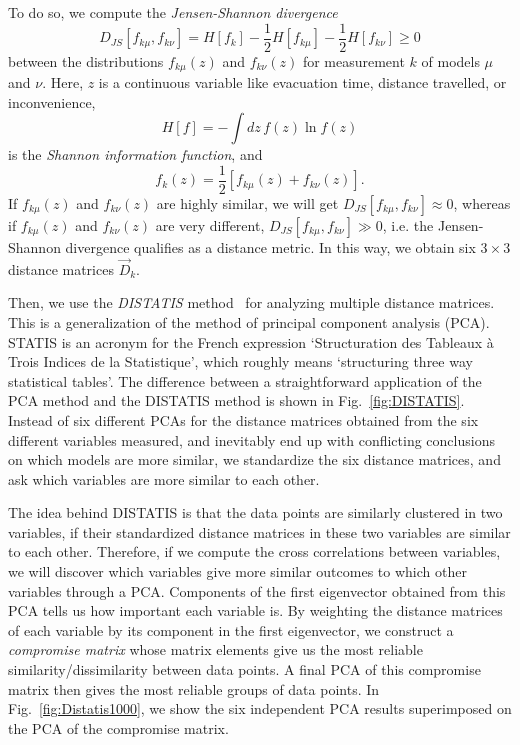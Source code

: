 To do so, we compute the \emph{Jensen-Shannon divergence}~\cite{Lin:1991it}
\begin{equation}
D_{JS}[f_{k\mu}, f_{k\nu}] = H[f_k] - \frac{1}{2} H[f_{k\mu}] - \frac{1}{2} H[f_{k\nu}] \geq 0
\end{equation}
between the distributions $f_{k\mu}(z)$ and $f_{k\nu}(z)$ for measurement $k$ of models $\mu$ and $\nu$. Here, $z$ is a continuous variable like evacuation time, distance travelled, or inconvenience,
\begin{equation}
H[f] = -\int dz\, f(z) \ln f(z)
\end{equation}
is the \emph{Shannon information function}, and
\begin{equation}
f_k(z) = \frac{1}{2}\left[f_{k\mu}(z) + f_{k\nu}(z)\right].
\end{equation}
If $f_{k\mu}(z)$ and $f_{k\nu}(z)$ are highly similar, we will get $D_{JS}[f_{k\mu}, f_{k\nu}] \approx 0$, whereas if $f_{k\mu}(z)$ and $f_{k\nu}(z)$ are very different, $D_{JS}[f_{k\mu}, f_{k\nu}] \gg 0$, i.e. the Jensen-Shannon divergence qualifies as a distance metric. In this way, we obtain six $3 \times 3$ distance matrices $\vec{D}_k$.

Then, we use the \emph{DISTATIS} method~\cite{Abdi:DISTATIS} for analyzing multiple distance matrices. This is a generalization of the method of principal component analysis (PCA). STATIS is an acronym for the French expression `Structuration des Tableaux \`{a} Trois Indices de la Statistique', which roughly means `structuring three way statistical tables'. The difference between a straightforward application of the PCA method and the DISTATIS method is shown in Fig.~\ref{fig:DISTATIS}. Instead of six different PCAs for the distance matrices obtained from the six different variables measured, and inevitably end up with conflicting conclusions on which models are more similar, we standardize the six distance matrices, and ask which variables are more similar to each other.

The idea behind DISTATIS is that the data points are similarly clustered in two variables, if their standardized distance matrices in these two variables are similar to each other. Therefore, if we compute the cross correlations between variables, we will discover which variables give more similar outcomes to which other variables through a PCA. Components of the first eigenvector obtained from this PCA tells us how important each variable is. By weighting the distance matrices of each variable by its component in the first eigenvector, we construct a \emph{compromise matrix} whose matrix elements give us the most reliable similarity/dissimilarity between data points. A final PCA of this compromise matrix then gives the most reliable groups of data points. In Fig.~\ref{fig:Distatis1000}, we show the six independent PCA results superimposed on the PCA of the compromise matrix.

